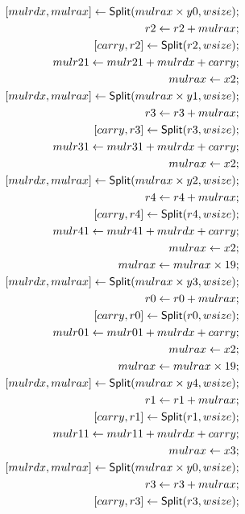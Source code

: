 \begin{align*}
\concat{mulrdx}{mulrax} \leftarrow \dslcode{Split}(mulrax \times y0, wsize); \\
r2 \leftarrow r2 + mulrax; \\
\concat{carry}{r2} \leftarrow \dslcode{Split}(r2, wsize); \\
mulr21 \leftarrow mulr21 + mulrdx + carry; \\
mulrax \leftarrow x2; \\
\concat{mulrdx}{mulrax} \leftarrow \dslcode{Split}(mulrax \times y1, wsize); \\
r3 \leftarrow r3 + mulrax; \\
\concat{carry}{r3} \leftarrow \dslcode{Split}(r3, wsize); \\
mulr31 \leftarrow mulr31 + mulrdx + carry; \\
mulrax \leftarrow x2; \\
\concat{mulrdx}{mulrax} \leftarrow \dslcode{Split}(mulrax \times y2, wsize); \\
r4 \leftarrow r4 + mulrax; \\
\concat{carry}{r4} \leftarrow \dslcode{Split}(r4, wsize); \\
mulr41 \leftarrow mulr41 + mulrdx + carry; \\
mulrax \leftarrow x2; \\
mulrax \leftarrow mulrax \times 19; \\
\concat{mulrdx}{mulrax} \leftarrow \dslcode{Split}(mulrax \times y3, wsize); \\
r0 \leftarrow r0 + mulrax; \\
\concat{carry}{r0} \leftarrow \dslcode{Split}(r0, wsize); \\
mulr01 \leftarrow mulr01 + mulrdx + carry; \\
mulrax \leftarrow x2; \\
mulrax \leftarrow mulrax \times 19; \\
\concat{mulrdx}{mulrax} \leftarrow \dslcode{Split}(mulrax \times y4, wsize); \\
r1 \leftarrow r1 + mulrax; \\
\concat{carry}{r1} \leftarrow \dslcode{Split}(r1, wsize); \\
mulr11 \leftarrow mulr11 + mulrdx + carry; \\
mulrax \leftarrow x3; \\
\concat{mulrdx}{mulrax} \leftarrow \dslcode{Split}(mulrax \times y0, wsize); \\
r3 \leftarrow r3 + mulrax; \\
\concat{carry}{r3} \leftarrow \dslcode{Split}(r3, wsize); \\

\end{align*}
